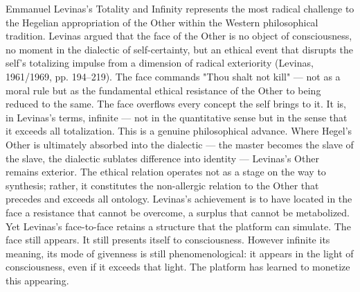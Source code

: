 Emmanuel Levinas's Totality and Infinity represents the most radical challenge to the Hegelian appropriation of the Other within the Western philosophical tradition. Levinas argued that the face of the Other is no object of consciousness, no moment in the dialectic of self-certainty, but an ethical event that disrupts the self's totalizing impulse from a dimension of radical exteriority (Levinas, 1961/1969, pp. 194–219). The face commands "Thou shalt not kill" — not as a moral rule but as the fundamental ethical resistance of the Other to being reduced to the same. The face overflows every concept the self brings to it. It is, in Levinas's terms, infinite — not in the quantitative sense but in the sense that it exceeds all totalization. This is a genuine philosophical advance. Where Hegel's Other is ultimately absorbed into the dialectic — the master becomes the slave of the slave, the dialectic sublates difference into identity — Levinas's Other remains exterior. The ethical relation operates not as a stage on the way to synthesis; rather, it constitutes the non-allergic relation to the Other that precedes and exceeds all ontology. Levinas's achievement is to have located in the face a resistance that cannot be overcome, a surplus that cannot be metabolized. Yet Levinas's face-to-face retains a structure that the platform can simulate. The face still appears. It still presents itself to consciousness. However infinite its meaning, its mode of givenness is still phenomenological: it appears in the light of consciousness, even if it exceeds that light. The platform has learned to monetize this appearing.

